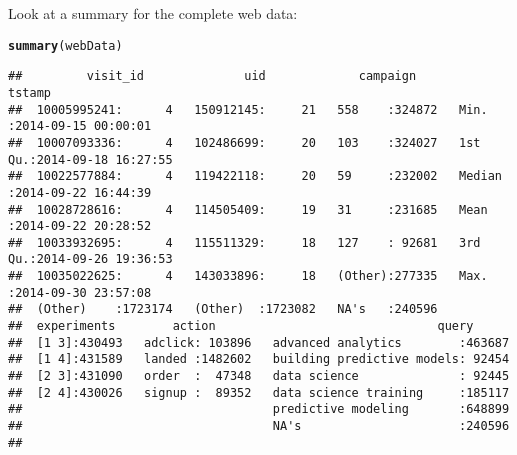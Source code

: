 \documentclass{article}\usepackage[]{graphicx}\usepackage[]{color}
\makeatletter
\newcommand{\hlstd}[1]{\textcolor[rgb]{0.345,0.345,0.345}{#1}}%
\newcommand{\hlkwd}[1]{\textcolor[rgb]{0.737,0.353,0.396}{\textbf{#1}}}%
\newenvironment{kframe}{%
 \def\at@end@of@kframe{}%
 \ifinner\ifhmode%
  \def\at@end@of@kframe{\end{minipage}}%
  \begin{minipage}{\columnwidth}%
 \fi\fi%
 \def\FrameCommand##1{\hskip\@totalleftmargin \hskip-\fboxsep
 \colorbox{shadecolor}{##1}\hskip-\fboxsep
     \hskip-\linewidth \hskip-\@totalleftmargin \hskip\columnwidth}%
 \MakeFramed {\advance\hsize-\width
   \@totalleftmargin\z@ \linewidth\hsize
   \@setminipage}}%
 {\par\unskip\endMakeFramed%
 \at@end@of@kframe}
\newenvironment{knitrout}{}{} %
\makeatother
\begin{document}
Look at a summary for the complete web data:
\begin{knitrout}
\color{fgcolor}\begin{kframe}
\begin{alltt}
\hlkwd{summary}\hlstd{(webData)}
\end{alltt}
\begin{verbatim}
##         visit_id              uid             campaign          tstamp                   
##  10005995241:      4   150912145:     21   558    :324872   Min.   :2014-09-15 00:00:01  
##  10007093336:      4   102486699:     20   103    :324027   1st Qu.:2014-09-18 16:27:55  
##  10022577884:      4   119422118:     20   59     :232002   Median :2014-09-22 16:44:39  
##  10028728616:      4   114505409:     19   31     :231685   Mean   :2014-09-22 20:28:52  
##  10033932695:      4   115511329:     18   127    : 92681   3rd Qu.:2014-09-26 19:36:53  
##  10035022625:      4   143033896:     18   (Other):277335   Max.   :2014-09-30 23:57:08  
##  (Other)    :1723174   (Other)  :1723082   NA's   :240596                                
##  experiments        action                               query       
##  [1 3]:430493   adclick: 103896   advanced analytics        :463687  
##  [1 4]:431589   landed :1482602   building predictive models: 92454  
##  [2 3]:431090   order  :  47348   data science              : 92445  
##  [2 4]:430026   signup :  89352   data science training     :185117  
##                                   predictive modeling       :648899  
##                                   NA's                      :240596  
## 
\end{verbatim}
\end{kframe}
\end{knitrout}
\end{document}
